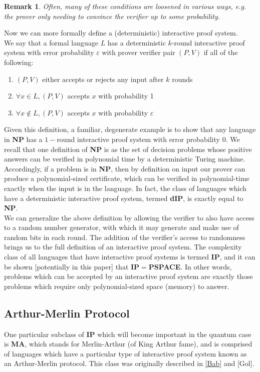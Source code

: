 \documentclass[12pt]{article}
\newtheorem*{rmk}{Remark}
\begin{document}
	\begin{rmk} Often, many of these conditions are loosened in various ways, e.g. the prover only needing to convince the verifier up to some probability.\end{rmk}
	
	Now we can more formally define a (deterministic) interactive proof system.\\
	
	We say that a formal language $L$ has a  deterministic $k$-round interactive proof system with error probability $\varepsilon$ with prover verifier pair $(P,V)$ if all of the following:
	\begin{enumerate}
		\item $(P,V)$ either accepts or rejects any input after $k$ rounds
		\item $\forall x\in L, (P,V)$ accepts $x$ with probability 1
		\item $\forall x\notin L, (P,V)$ accepts $x$ with probability $\varepsilon$ 
	\end{enumerate}
	
	Given this definition, a familiar, degenerate example is to show that any language in \textbf{NP} has a $1-$round interactive proof system with error probability $0$. We recall that one definition of \textbf{NP} is as the set of decision problems whose positive answers can be verified in polynomial time by a deterministic Turing machine. Accordingly, if a problem is in \textbf{NP}, then by definition on input our prover can produce a polynomial-sized certificate, which can be verified in polynomial-time exactly when the input is in the language. In fact, the class of languages which have a deterministic interactive proof system, termed \textbf{dIP}, is exactly equal to \textbf{NP}. \\
	
	We can generalize the above definition by allowing the verifier to also have access to a random number generator, with which it may generate and make use of random bits in each round. The addition of the verifier's access to randomness brings us to the full definition of an interactive proof system. The complexity class of all languages that have interactive proof systems is termed \textbf{IP}, and it can be shown [potentially in this paper] that \textbf{IP}$=$\textbf{PSPACE}. In other words, problems which can be accepted by an interactive proof system are exactly those problems which require only polynomial-sized space (memory) to answer. 
	\subsection{Arthur-Merlin Protocol}
	One particular subclass of \textbf{IP} which will become important in the quantum case is \textbf{MA}, which stands for Merlin-Arthur (of King Arthur fame), and is comprised of languages which have a particular type of interactive proof system known as an Arthur-Merlin protocol. This class was originally described in \hyperref[bab]{[Bab]} and [Gol].
	
\end{document}
